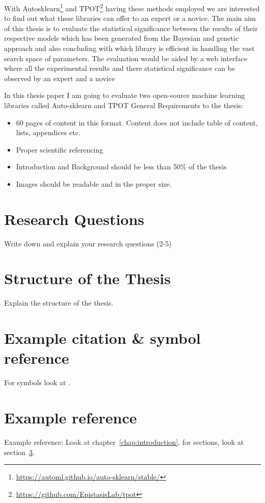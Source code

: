 With Autosklearn\footnote{\url{https://automl.github.io/auto-sklearn/stable/}} and TPOT\footnote{\url{https://github.com/EpistasisLab/tpot}} having these methods employed we are interested to find out what these libraries can offer to an expert or a novice. The main aim of this thesis is to evaluate the statistical significance between the results of their respective models which has been generated from the Bayesian and genetic approach and also concluding with which library is efficient in handling the vast search space of parameters. The evaluation would be aided by a web interface where all the experimental results and there statistical significance can be observed by an expert and a novice



In this thesis paper I am going to evaluate two open-source machine learning libraries called Auto-sklearn\cite{autosklearn} and TPOT\cite{tpot}
General Requirements to the thesis:

\begin{itemize}
	\item 60 pages of content in this format. Content does not include table of content, lists, appendices etc.
	\item Proper scientific referencing
	\item Introduction and Background should be less than 50\% of the thesis
	\item Images should be readable and in the proper size. 
\end{itemize}


\section{Research Questions}

Write down and explain your research questions (2-5)

\section{Structure of the Thesis}

Explain the structure of the thesis. 

\section{Example citation \& symbol reference}\label{sec:citation}
For symbols look at \cite{latex_symbols_2017}.


\section{Example reference}
Example reference: Look at chapter~\ref{chap:introduction}, for sections, look at section~\ref{sec:citation}.

